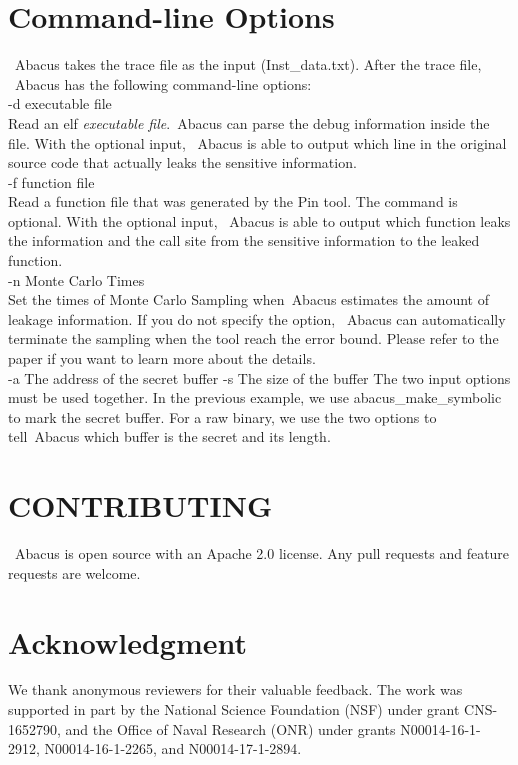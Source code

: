 \documentclass[10pt,conference]{IEEEtran}
\newcommand{\tool}{\textsf{Abacus}}
\begin{document}
\section{Command-line Options}
~\tool{} takes the trace file as the input (\textsf{Inst\_data.txt}). After the trace file, ~\tool{} has the following command-line options:
\vspace{5pt}
\\-d {executable file}
\\ Read an elf \textit{executable file}.~\tool{} can parse the debug information inside the file. With the optional input, ~\tool{} is able to output which line in the original source code that actually leaks the sensitive information.
\vspace{5pt}
\\-f {function file}
\\Read a function file that was generated by the Pin tool. The command is optional. With the optional input, ~\tool{} is able to output which function leaks the information and the call site from the sensitive information to the leaked function.
\vspace{5pt}
\\-n {Monte Carlo Times}
\\ Set the times of Monte Carlo Sampling when~\tool{} estimates the amount of leakage information. If you do not specify the option, ~\tool{} can automatically terminate the sampling when the tool reach the error bound. Please refer to the paper if you want to learn more about the details.
\vspace{5pt}
\\-a {The address of the secret buffer} -s {The size of the buffer}
The two input options must be used together. In the previous example, we use abacus\_make\_symbolic to mark the secret buffer. For a raw binary, we use the two options to tell~\tool{} which buffer is the secret and its length.

\section{CONTRIBUTING}
~\tool{} is open source with an Apache 2.0 license. Any pull requests and feature requests are welcome.

\section*{Acknowledgment}
We thank anonymous reviewers for their valuable feedback. The work was supported in part by the National Science Foundation (NSF) under grant CNS-1652790, and the Office of Naval Research (ONR) under grants N00014-16-1-2912, N00014-16-1-2265, and N00014-17-1-2894. 





\end{document}
